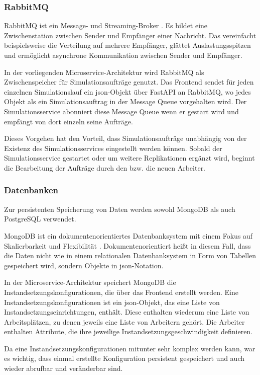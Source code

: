 \documentclass[11pt,a4paper]{article}
\begin{document}

\subsubsection{RabbitMQ}
\label{sec:RabbitMQ}
RabbitMQ ist ein Message- und Streaming-Broker \cite{RabbitMQ}. Es bildet eine Zwischenstation
zwischen Sender und Empfänger einer Nachricht. Das vereinfacht beispielsweise die Verteilung auf 
mehrere Empfänger, glättet Auslastungsspitzen und ermöglicht asynchrone Kommunikation zwischen
Sender und Empfänger. 

In der vorliegenden Microservice-Architektur wird RabbitMQ als Zwischenspeicher für
Simulationsaufträge genutzt. Das Frontend sendet für jeden einzelnen Simulationslauf
ein json-Objekt über FastAPI an RabbitMQ, wo jedes Objekt als ein Simulationsauftrag
in der Message Queue vorgehalten wird. Der Simulationsservice abonniert diese Message Queue
wenn er gestart wird und empfängt von dort einzeln seine Aufträge.

Dieses Vorgehen hat den Vorteil, dass Simulationsaufträge unabhängig von der Existenz
des Simulationsservices eingestellt werden können. Sobald der Simulationsservice gestartet
oder um weitere Replikationen ergänzt wird, beginnt die Bearbeitung der Aufträge durch den
bzw. die neuen Arbeiter.

\subsubsection{Datenbanken}
\label{sec:Datenbanken}
Zur persistenten Speicherung von Daten werden sowohl MongoDB als auch PostgreSQL verwendet.

MongoDB ist ein dokumentenorientiertes Datenbanksystem mit einem Fokus auf Skalierbarkeit und Flexibilität \cite{Bradshaw_2010}.
Dokumentenorientiert heißt in diesem Fall, dass die Daten nicht wie in einem relationalen
Datenbanksystem in Form von Tabellen gespeichert wird, sondern Objekte in json-Notation.

In der Microservice-Architektur speichert MongoDB die Instandsetzungskonfigurationen,
die über das Frontend erstellt werden.
Eine Instandsetzungskonfigurationen ist ein json-Objekt, das eine Liste von Instandsetzungseinrichtungen,
enthält. Diese enthalten wiederum eine Liste von Arbeitsplätzen, zu denen jeweils eine Liste
von Arbeitern gehört. 
Die Arbeiter enthalten Attribute, die ihre jeweilige Instandsetzungsgeschwindigkeit definieren.

Da eine Instandsetzungskonfigurationen mitunter sehr komplex werden kann, war es wichtig,
dass einmal erstellte Konfiguration persistent gespeichert und auch wieder abrufbar und veränderbar sind.
\end{document}
